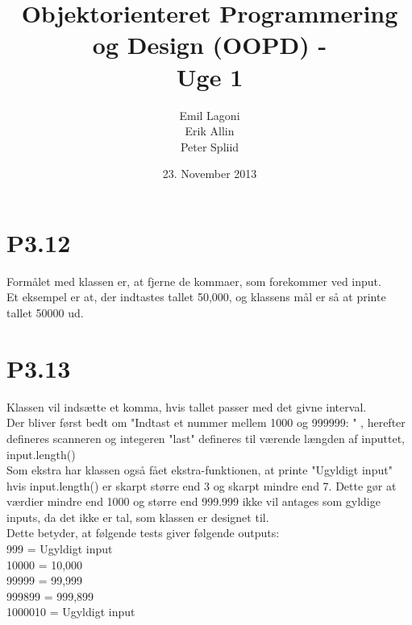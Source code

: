 \documentclass[a4paper,12pt]{article}
\title{Objektorienteret Programmering og Design (OOPD) - \\ Uge 1}
\author{Emil Lagoni \\ Erik Allin \\ Peter Spliid}
\date{23. November 2013}
\begin{document}
\maketitle %
\thispagestyle{empty}
\setcounter{page}{0}
\newpage



\section*{P3.12}
Formålet med klassen er, at fjerne de kommaer, som forekommer ved input.\\
Et eksempel er at, der indtastes tallet 50,000, og klassens mål er så at printe tallet 50000 ud.

\section*{P3.13}
Klassen vil indsætte et komma, hvis tallet passer med det givne interval.\\
Der bliver først bedt om "Indtast et nummer mellem 1000 og 999999: " , herefter defineres scanneren og integeren "last" defineres til værende længden af inputtet, input.length() \\
Som ekstra har klassen også fået ekstra-funktionen, at printe "Ugyldigt input" hvis input.length() er skarpt større end 3 og skarpt mindre end 7. Dette gør at værdier mindre end 1000 og større end 999.999 ikke vil antages som gyldige inputs, da det ikke er tal, som klassen er designet til. \\
Dette betyder, at følgende tests giver følgende outputs: \\[5px]
999 = Ugyldigt input \\
10000 = 10,000 \\
99999 = 99,999 \\
999899 = 999,899 \\
1000010 = Ugyldigt input
\end{document}
